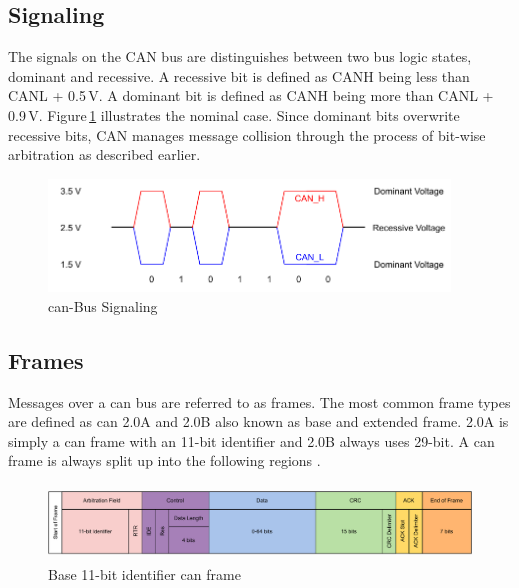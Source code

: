 \subsection{Signaling}
The signals on the CAN bus are distinguishes between two bus logic states, dominant and recessive. A recessive bit is defined as CANH being less than CANL + 0.5\,V. A dominant bit is defined as CANH being more than CANL + 0.9\,V. Figure\,\ref{fig:can-signaling} illustrates the nominal case. Since dominant bits overwrite recessive bits, CAN manages message collision through the process of bit-wise arbitration as described earlier.

\begin{figure}[h!]
	\centering
	\includegraphics[height=3cm]{images/can-signaling}
	\caption{\acrshort{can}-Bus Signaling}
	\label{fig:can-signaling}
\end{figure}

\subsection{Frames}
Messages over a \acrshort{can} bus are referred to as frames. The most common frame types are defined as \acrshort{can} 2.0A and 2.0B also known as base and extended frame. 2.0A is simply a \acrshort{can} frame with an 11-bit identifier and 2.0B always uses 29-bit. A \acrshort{can} frame is always split up into the following regions \cite{can_bus_tutorial}.

\begin{figure}[h!]
	\centering
	\includegraphics[height=2cm]{images/can-frame}
	\caption{Base 11-bit identifier \acrshort{can} frame}
	\label{fig:can-frame}
\end{figure}


